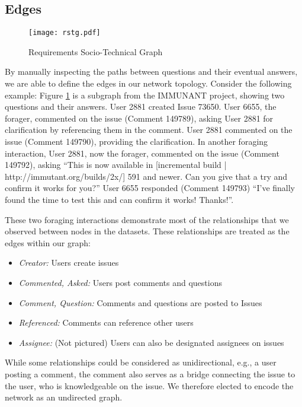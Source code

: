 \subsection{Edges}

\begin{figure}
	\centering
	\texttt{[image: rstg.pdf]}
	\caption{Requirements Socio-Technical Graph}
	\label{fig:rstg}
\end{figure}

By manually inspecting the paths between questions and their eventual answers, we are able to define the edges in our network topology. Consider the following example: Figure \ref{fig:rstg} is a subgraph from the IMMUNANT project, showing two questions and their answers. User 2881 created Issue 73650. User 6655, the forager, commented on the issue (Comment 149789), asking User 2881 for clarification by referencing them in the comment. User 2881 commented on the issue (Comment 149790), providing the clarification. In another foraging interaction, User 2881, now the forager, commented on the issue (Comment 149792), asking ``This is now available in [incremental build | http://immutant.org/builds/2x/] 591 and newer. Can you give that a try and confirm it works for you?'' User 6655 responded (Comment 149793) ``I've finally found the time to test this and can confirm it works! Thanks!''. 

These two foraging interactions demonstrate most of the relationships that we observed between nodes in the datasets. These relationships are treated as the edges within our graph:
\begin{samepage}
\begin{itemize}
  \item \textit{Creator:} Users create issues
  \item \textit{Commented, Asked: }Users post comments and questions
  \item \textit{Comment, Question:} Comments and questions are posted to Issues
  \item \textit{Referenced:} Comments can reference other users
  \item \textit{Assignee:} (Not pictured) Users can also be designated assignees on issues 
\end{itemize}
\end{samepage}
While some relationships could be considered as unidirectional, e.g., a user posting a comment, the comment also serves as a bridge connecting the issue to the user, who is knowledgeable on the issue. We therefore elected to encode the network as an undirected graph.

